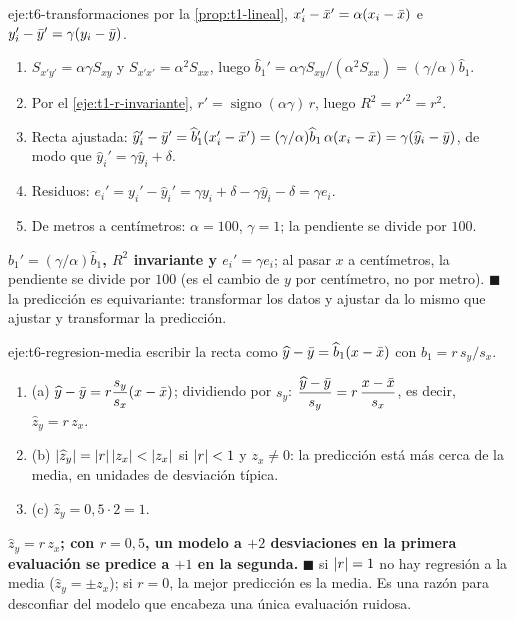 \begin{solucion}{eje:t6-transformaciones}
\planteamiento por la \cref{prop:t1-lineal}, $x_i'-\bar{x}'=\alpha(x_i-\bar{x})$ e $y_i'-\bar{y}'=\gamma(y_i-\bar{y})$.
\pasos
\begin{enumerate}[label=\arabic*.]
  \item $S_{x'y'}=\alpha\gamma S_{xy}$ y $S_{x'x'}=\alpha^{2}S_{xx}$, luego $\widehat b_1'=\alpha\gamma S_{xy}/(\alpha^{2}S_{xx})=(\gamma/\alpha)\widehat b_1$.
  \item Por el \cref{eje:t1-r-invariante}, $r'=\operatorname{signo}(\alpha\gamma)\,r$, luego $R^{2}=r'^{2}=r^{2}$.
  \item Recta ajustada: $\widehat y_i'-\bar{y}'=\widehat b_1'(x_i'-\bar{x}')=(\gamma/\alpha)\widehat b_1\,\alpha(x_i-\bar{x})=\gamma(\widehat y_i-\bar{y})$, de modo que $\widehat y_i'=\gamma\widehat y_i+\delta$.
  \item Residuos: $e_i'=y_i'-\widehat y_i'=\gamma y_i+\delta-\gamma\widehat y_i-\delta=\gamma e_i$.
  \item De metros a centímetros: $\alpha=100$, $\gamma=1$; la pendiente se divide por $100$.
\end{enumerate}
\resultado \textbf{$\widehat b_1'=(\gamma/\alpha)\widehat b_1$, $R^{2}$ invariante y $e_i'=\gamma e_i$}; al pasar $x$ a centímetros, la pendiente se divide por $100$ (es el cambio de $y$ por centímetro, no por metro). $\blacksquare$
\comprobacion la predicción es equivariante: transformar los datos y ajustar da lo mismo que ajustar y transformar la predicción.
\end{solucion}

\begin{solucion}{eje:t6-regresion-media}
\planteamiento escribir la recta como $\widehat y-\bar{y}=\widehat b_1(x-\bar{x})$ con $\widehat b_1=r\,s_y/s_x$.
\pasos
\begin{enumerate}[label=\arabic*.]
  \item (a) $\widehat y-\bar{y}=r\dfrac{s_y}{s_x}(x-\bar{x})$; dividiendo por $s_y$: $\dfrac{\widehat y-\bar{y}}{s_y}=r\,\dfrac{x-\bar{x}}{s_x}$, es decir, $\widehat z_y=r\,z_x$.
  \item (b) $\lvert\widehat z_y\rvert=\lvert r\rvert\,\lvert z_x\rvert<\lvert z_x\rvert$ si $\lvert r\rvert<1$ y $z_x\ne0$: la predicción está más cerca de la media, en unidades de desviación típica.
  \item (c) $\widehat z_y=0{,}5\cdot2=1$.
\end{enumerate}
\resultado \textbf{$\widehat z_y=r\,z_x$; con $r=0{,}5$, un modelo a $+2$ desviaciones en la primera evaluación se predice a $+1$ en la segunda.} $\blacksquare$
\comprobacion si $\lvert r\rvert=1$ no hay regresión a la media ($\widehat z_y=\pm z_x$); si $r=0$, la mejor predicción es la media. Es una razón para desconfiar del modelo que encabeza una única evaluación ruidosa.
\end{solucion}
